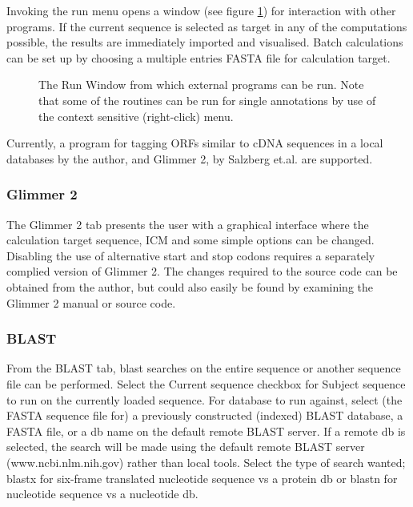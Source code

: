 Invoking the run menu opens a window (see figure \ref{fig:GUIrun}) for interaction with other programs. 
If the current sequence is selected as target in any of the computations possible,
the results are immediately imported and visualised. 
Batch calculations can be set up by choosing a multiple entries FASTA file for 
calculation target.

\begin{figure}[htbp]
	\begin{center}
	\end{center}
\caption{The Run Window from which external programs can be run. Note that some of the routines can be run for single annotations by use of the context sensitive (right-click) menu.}
\label{fig:GUIrun}
\end{figure}

Currently, a program for tagging ORFs similar to cDNA sequences in a
local databases by the author, and Glimmer 2, by Salzberg
et.al. are supported.

\subsubsection{Glimmer 2}

The Glimmer 2 tab presents the user with a graphical interface where
the calculation target sequence, ICM and some simple options can be
changed. Disabling the use of alternative start and stop codons
requires a separately complied version of Glimmer 2. The changes
required to the source code can be obtained from the author, but could
also easily be found by examining the Glimmer 2 manual or source code.

\subsubsection{BLAST}

From the BLAST tab, blast searches on the entire sequence or another
sequence file can be performed. Select the Current sequence checkbox
for Subject sequence to run on the currently loaded sequence. For
database to run against, select (the FASTA sequence file for) a
previously constructed (indexed) BLAST database, a FASTA file, or a db
name on the default remote BLAST server. If a remote db is selected,
the search will be made using the default remote BLAST server
(www.ncbi.nlm.nih.gov) rather than local tools. Select the type of
search wanted; blastx for six-frame translated nucleotide sequence vs
a protein db or blastn for nucleotide sequence vs a nucleotide db.

